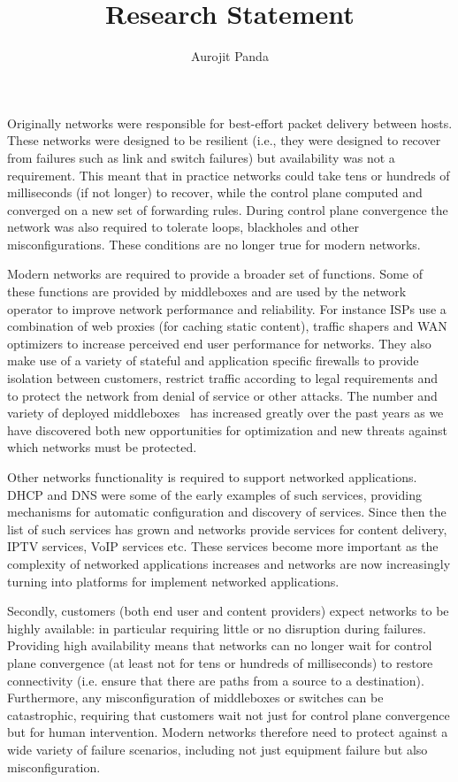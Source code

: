 \documentclass[letterpaper]{article}
\begin{document}
\title{\Large Research Statement}
\author{Aurojit Panda}
\date{}
\thispagestyle{empty}
\maketitle
Originally networks were responsible for best-effort packet delivery between hosts. These networks
were designed to be resilient (i.e., they were designed to recover from failures such as link and switch failures) but
availability was not a requirement. This meant that in practice networks could take tens or hundreds of milliseconds (if
not longer) to recover, while the control plane computed and converged on a new set of forwarding rules. During control
plane convergence the network was also required to tolerate loops, blackholes and other misconfigurations. These
conditions are no longer true for modern networks.

Modern networks are required to provide a broader set of functions. Some of these functions are provided by middleboxes and are
used by the network operator to improve network performance and reliability. For instance ISPs use a combination of web
proxies (for caching static content), traffic shapers and WAN optimizers to increase perceived end user performance for
networks. They also make use of a variety of stateful and application specific firewalls to provide isolation between
customers, restrict traffic according to legal requirements and to protect the network from denial of service or other
attacks. The number and variety of deployed middleboxes~\cite{sherry2012making} has increased greatly over the past
years as we have discovered both new opportunities for optimization and new threats against which networks must be
protected.

Other networks functionality is required to support networked applications. DHCP and DNS were some of the early examples
of such services, providing mechanisms for automatic configuration and discovery of services. Since then the list of
such services has grown and networks provide services for content delivery, IPTV services, VoIP services etc. These
services become more important as the complexity of networked applications increases and networks are now increasingly
turning into platforms for implement networked applications.

Secondly, customers (both end user and content providers) expect networks to be highly available: in particular
requiring little or no disruption during failures. Providing high availability means that networks can no longer wait
for control plane convergence (at least not for tens or hundreds of milliseconds) to restore connectivity (i.e. ensure
that there are paths from a source to a destination). Furthermore, any misconfiguration of middleboxes or switches can
be catastrophic, requiring that customers wait not just for control plane convergence but for human intervention. Modern
networks therefore need to protect against a wide variety of failure scenarios, including not just equipment failure but
also misconfiguration.
\end{document}
